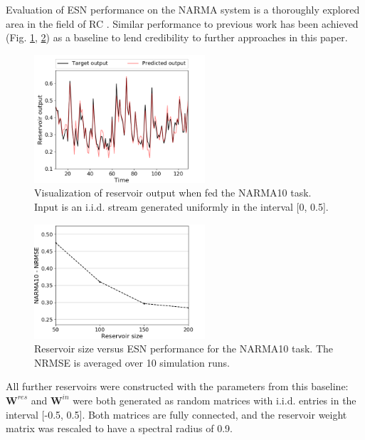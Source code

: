 Evaluation of ESN performance on the NARMA system is a thoroughly explored area
in the field of RC \cite{verstraeten_experimental_2007, rodan_minimum_2011,
jaeger_adaptive_nodate}. Similar performance to previous work has been achieved
(Fig. \ref{visualization}, \ref{performance}) as a baseline to lend credibility
to further approaches in this paper.

\begin{figure}[H]
  \centering
  \includegraphics[width=2.5in]{img/narma_visualization.png}
  \caption{
    Visualization of reservoir output when fed the NARMA10 task. Input is an
i.i.d. stream generated uniformly in the interval [0, 0.5].
  }
  \label{visualization}
\end{figure}

\begin{figure}[H]
  \centering
  \includegraphics[width=2.5in]{img/general_performance.png}
  \caption{
    Reservoir size versus ESN performance for the NARMA10 task. The NRMSE is
averaged over 10 simulation runs.
  }
  \label{performance}
\end{figure}

All further reservoirs were constructed with the parameters from this baseline:
$\mathbf{W}^{res}$ and $\mathbf{W}^{in}$ were both generated as random matrices
with i.i.d. entries in the interval [-0.5, 0.5]. Both matrices are fully
connected, and the reservoir weight matrix was rescaled to have a spectral
radius of 0.9.



